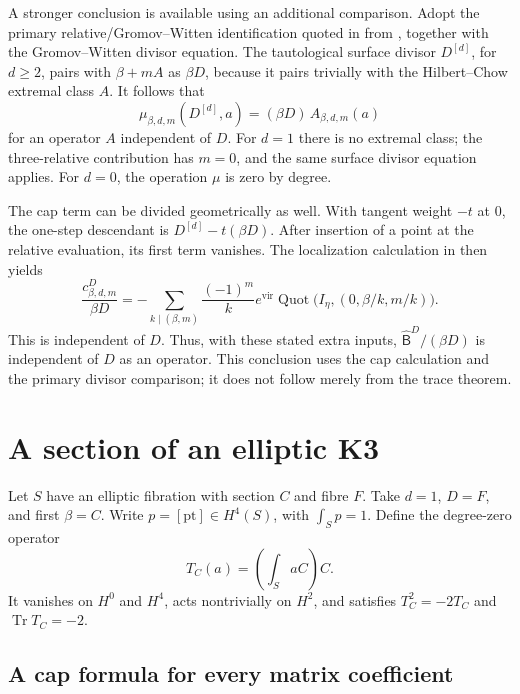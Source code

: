 A stronger conclusion is available using an additional comparison.
Adopt the primary relative/Gromov--Witten identification quoted in
\cite[\S6.3]{OberdieckMC} from \cite[Corollary 4.1]{NesterovK3},
together with the Gromov--Witten divisor equation. The tautological
surface divisor $D^{[d]}$, for $d\ge2$, pairs with $\beta+mA$ as $\beta D$,
because it pairs trivially with the Hilbert--Chow extremal class $A$.
It follows that
\[
 \mu_{\beta,d,m}(D^{[d]},a)=(\beta D)\,A_{\beta,d,m}(a)
\]
for an operator $A$ independent of $D$.
For $d=1$ there is no extremal class; the three-relative contribution
has $m=0$, and the same surface divisor equation applies. For $d=0$,
the operation $\mu$ is zero by degree.

The cap term can be divided geometrically as well. With tangent
weight $-t$ at $0$, the one-step descendant is
$D^{[d]}-t(\beta D)$. After insertion of a point at the relative
evaluation, its first term vanishes. The localization calculation in
\cite[Theorem 4.2]{OberdieckMC} then yields
\begin{equation}\label{rdt:eq:capQ}
 \frac{c^D_{\beta,d,m}}{\beta D}
 =-\sum_{k\mid(\beta,m)}\frac{(-1)^m}{k}
    e^{\mathrm{vir}}\operatorname{Quot}\bigl(I_\eta,(0,\beta/k,m/k)\bigr).
\end{equation}
This is independent of $D$. Thus, with these stated extra inputs,
$\widehat{\mathsf B}^D/(\beta D)$ is independent of $D$ as an operator. This
conclusion uses the cap calculation and the primary divisor comparison;
it does not follow merely from the trace theorem.

\section{A section of an elliptic K3}
\label{rdt:sec:example}

Let $S$ have an elliptic fibration with section $C$ and fibre $F$.
Take $d=1$, $D=F$, and first $\beta=C$. Write
$p=[\mathrm{pt}]\in H^4(S)$, with $\int_Sp=1$. Define the
degree-zero operator
\begin{equation}\label{rdt:eq:T}
 T_C(a)=\left(\int_SaC\right)C.
\end{equation}
It vanishes on $H^0$ and $H^4$, acts nontrivially on $H^2$, and
satisfies $T_C^2=-2T_C$ and $\operatorname{Tr} T_C=-2$.

\subsection{A cap formula for every matrix coefficient}

